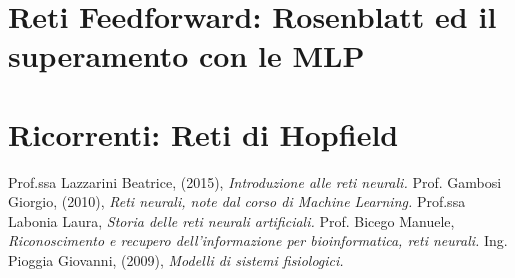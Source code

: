 \documentclass[12pt,a4paper,oneside]{book}
\begin{document}
    
    
    
   
   

    	 
	
	
	\chapter{Reti Feedforward: Rosenblatt ed il superamento con le MLP}
	
	\chapter{Ricorrenti: Reti di Hopfield}

\clearpage 
\begin{thebibliography}{9} 
	 Prof.ssa Lazzarini Beatrice, (2015), \emph{Introduzione alle reti neurali.}
	 Prof. Gambosi Giorgio, (2010), \emph{Reti neurali, note dal corso di Machine Learning.}
	 Prof.ssa Labonia Laura, \emph{Storia delle reti neurali artificiali.}
	 Prof. Bicego Manuele, \emph{Riconoscimento e recupero dell’informazione per bioinformatica, reti neurali.}
	 Ing. Pioggia Giovanni, (2009), \emph{Modelli di sistemi fisiologici.}
 \end{thebibliography}
	
\end{document}
